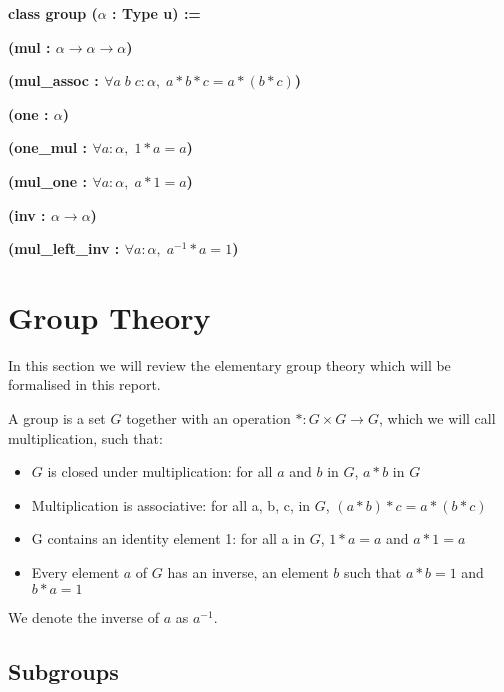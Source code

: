 \documentclass[runningheads,a4paper]{llncs}
\renewcommand{\a}{\alpha}
\renewcommand{\-}{\setminus}
\begin{document}
\vspace{2 mm}
\hspace{2 em}\textbf{class group ($\a$ : Type u) := }

\hspace{4 em}\textbf{(mul : $\a \to \a \to \a$)}

\hspace{4 em}\textbf{(mul\_assoc : $\forall a\; b\; c : \a,\; a * b * c = a * (b * c)$)}

\hspace{4 em}\textbf{(one : $\a$)}

\hspace{4 em}\textbf{(one\_mul : $\forall a : \a,\; 1 * a = a$)}

\hspace{4 em}\textbf{(mul\_one : $\forall a : \a,\; a * 1 = a$)}

\hspace{4 em}\textbf{(inv : $\a \to \a$)}

\hspace{4 em}\textbf{(mul\_left\_inv : $\forall a : \a,\; a^{-1} * a = 1$)}
\vspace{2 mm}

\section{Group Theory}

In this section we will review the elementary group theory\cite{artin} which will be formalised in this report.

\begin{definition}[Group] 
A group is a set $G$ together with an operation $* : G \times G \to G$, which we will call multiplication, such that:
\begin{itemize}
\item $G$ is closed under multiplication: for all $a$ and $b$ in $G$, $a*b$ in $G$
\item Multiplication is associative: for all a, b, c, in $G$, $(a*b)*c = a*(b*c)$
\item G contains an identity element 1: for all a in $G$, $1*a = a$ and $a*1=a$
\item Every element $a$ of $G$ has an inverse, an element $b$ such that $a*b = 1$ and $b*a =1$
\end{itemize}

We denote the inverse of $a$ as $a^{-1}$.
\end{definition}

\subsection{Subgroups}
\end{document}
